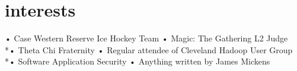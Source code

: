 \documentclass[]{friggeri-cv}
\begin{document}
\section{interests}
•	Case Western Reserve Ice Hockey Team
•	Magic: The Gathering L2 Judge
\\*•	Theta Chi Fraternity
•	Regular attendee of Cleveland Hadoop User Group
\\*•	Software Application Security
•	Anything written by James Mickens
% 
\end{document}
